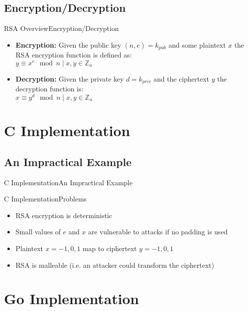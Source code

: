 \documentclass[presentation]{beamer}
\begin{document}
\subsection{Encryption/Decryption}
\begin{frame}{RSA Overview}{Encryption/Decryption}
  \begin{itemize}
    \item \textbf{Encryption:} Given the public key $(n,e)=k_{pub}$ and some plaintext $x$ the RSA
      encryption function is defined as: \\ $y \equiv x^{e}\mod n \mid x,y \in \mathbb{Z}_{n}$
      \pause
    \item \textbf{Decryption:} Given the private key $d=k_{priv}$ and the
      ciphertext $y$ the decryption function is: \\ $x \equiv y^{d} \mod n \mid x,y \in \mathbb{Z}_{n}$
  \end{itemize}
\end{frame}
\section{C Implementation}
\subsection{An Impractical Example}
\begin{frame}{C Implementation}{An Impractical Example}
  \begin{center}
  \end{center}
\end{frame}
\begin{frame}{C Implementation}{Problems}
  \begin{itemize}
    \item RSA encryption is deterministic
      \pause
    \item Small values of $e$ and $x$ are vulnerable to attacks if no
      padding is used
      \pause
    \item Plaintext $x=-1,0,1$ map to ciphertext $y=-1,0,1$
      \pause
    \item RSA is malleable (i.e. an attacker could transform the
      ciphertext)
  \end{itemize}
\end{frame}
\section{Go Implementation}
\end{document}
